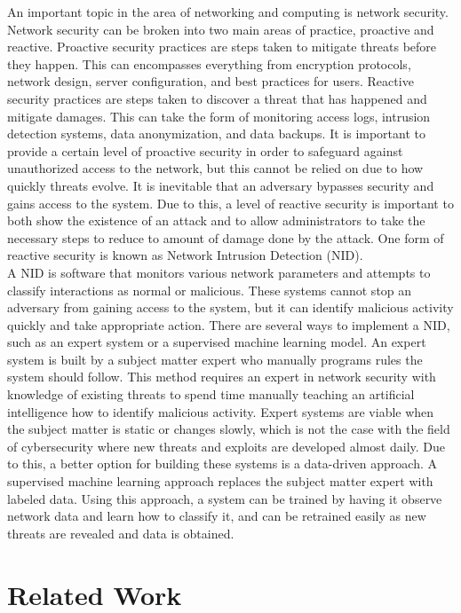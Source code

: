 \documentclass{article}
\begin{document}
An important topic in the area of networking and computing is network security. Network security can be broken into two main areas of practice, proactive and reactive. Proactive security practices are steps taken to mitigate threats before they happen. This can encompasses everything from encryption protocols, network design, server configuration, and best practices for users. Reactive security practices are steps taken to discover a threat that has happened and mitigate damages. This can take the form of monitoring access logs, intrusion detection systems, data anonymization, and data backups. It is important to provide a certain level of proactive security in order to safeguard against unauthorized access to the network, but this cannot be relied on due to how quickly threats evolve. It is inevitable that an adversary bypasses security and gains access to the system. Due to this, a level of reactive security is important to both show the existence of an attack and to allow administrators to take the necessary steps to reduce to amount of damage done by the attack. One form of reactive security is known as Network Intrusion Detection (NID). 
\\
A NID is software that monitors various network parameters and attempts to classify interactions as normal or malicious. These systems cannot stop an adversary from gaining access to the system, but it can identify malicious activity quickly and take appropriate action. There are several ways to implement a NID, such as an expert system or a supervised machine learning model. An expert system is built by a subject matter expert who manually programs rules the system should follow. This method requires an expert in network security with knowledge of existing threats to spend time manually teaching an artificial intelligence how to identify malicious activity. Expert systems are viable when the subject matter is static or changes slowly, which is not the case with the field of cybersecurity where new threats and exploits are developed almost daily. Due to this, a better option for building these systems is a data-driven approach. A supervised machine learning approach replaces the subject matter expert with labeled data. Using this approach, a system can be trained by having it observe network data and learn how to classify it, and can be retrained easily as new threats are revealed and data is obtained. 

\section{Related Work}
\end{document}
